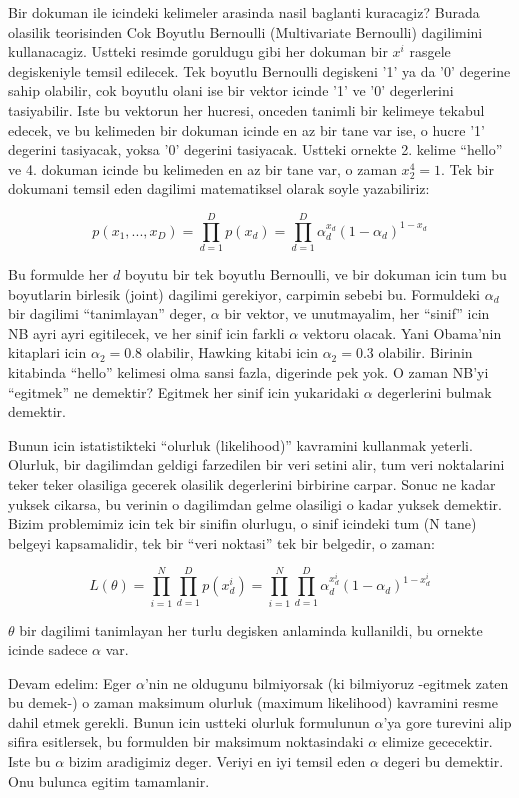 \documentclass[12pt,fleqn]{article}
\begin{document}
Bir dokuman ile icindeki kelimeler arasinda nasil baglanti kuracagiz?
Burada olasilik teorisinden Cok Boyutlu Bernoulli (Multivariate Bernoulli)
dagilimini kullanacagiz. Ustteki resimde goruldugu gibi her dokuman bir
$x^i$ rasgele degiskeniyle temsil edilecek. Tek boyutlu Bernoulli degiskeni
'1' ya da '0' degerine sahip olabilir, cok boyutlu olani ise bir vektor
icinde '1' ve '0' degerlerini tasiyabilir. Iste bu vektorun her hucresi,
onceden tanimli bir kelimeye tekabul edecek, ve bu kelimeden bir dokuman
icinde en az bir tane var ise, o hucre '1' degerini tasiyacak, yoksa '0'
degerini tasiyacak. Ustteki ornekte 2. kelime ``hello'' ve 4. dokuman
icinde bu kelimeden en az bir tane var, o zaman $x_2^4 = 1$. Tek bir
dokumani temsil eden dagilimi matematiksel olarak soyle yazabiliriz:

\[ p(x_1,...,x_{D}) = \prod_{d=1}^{D} p(x_d)=\prod_{d=1}^{D}
\alpha_d^{x_d}(1-\alpha_d)^{1-x_d} 
 \]

 Bu formulde her $d$ boyutu bir tek boyutlu Bernoulli, ve bir dokuman icin
 tum bu boyutlarin birlesik (joint) dagilimi gerekiyor, carpimin sebebi
 bu. Formuldeki $\alpha_d$ bir dagilimi ``tanimlayan'' deger, $\alpha$ bir
 vektor, ve unutmayalim, her ``sinif'' icin NB ayri ayri egitilecek, ve her
 sinif icin farkli $\alpha$ vektoru olacak. Yani Obama'nin kitaplari icin
 $\alpha_2 = 0.8$ olabilir, Hawking kitabi icin $\alpha_2 = 0.3$
 olabilir. Birinin kitabinda ``hello'' kelimesi olma sansi fazla, digerinde
 pek yok. O zaman NB'yi ``egitmek'' ne demektir? Egitmek her sinif icin
 yukaridaki $\alpha$ degerlerini bulmak demektir.

 Bunun icin istatistikteki ``olurluk (likelihood)'' kavramini kullanmak
 yeterli. Olurluk, bir dagilimdan geldigi farzedilen bir veri setini alir,
 tum veri noktalarini teker teker olasiliga gecerek olasilik degerlerini
 birbirine carpar. Sonuc ne kadar yuksek cikarsa, bu verinin o dagilimdan
 gelme olasiligi o kadar yuksek demektir. Bizim problemimiz icin tek bir
 sinifin olurlugu, o sinif icindeki tum (N tane) belgeyi kapsamalidir, tek
 bir ``veri noktasi'' tek bir belgedir, o zaman:

\[ L(\theta) = \prod_{i=1}^N \prod_{d=1}^{D} p(x_d^i) = 
\prod_{i=1}^N \prod_{d=1}^{D} \alpha_d^{x_d^i}(1-\alpha_d)^{1-x_d^i}
 \]

$\theta$ bir dagilimi tanimlayan her turlu degisken anlaminda kullanildi, bu
ornekte icinde sadece $\alpha$ var.

Devam edelim: Eger $\alpha$'nin ne oldugunu bilmiyorsak (ki bilmiyoruz
-egitmek zaten bu demek-) o zaman maksimum olurluk (maximum likelihood)
kavramini resme dahil etmek gerekli. Bunun icin ustteki olurluk formulunun
$\alpha$'ya gore turevini alip sifira esitlersek, bu formulden bir maksimum
noktasindaki $\alpha$ elimize gececektir. Iste bu $\alpha$ bizim aradigimiz
deger. Veriyi en iyi temsil eden $\alpha$ degeri bu demektir. Onu bulunca
egitim tamamlanir.
\end{document}
